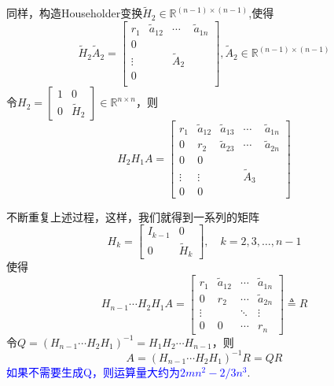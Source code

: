\documentclass[notheorems,serif]{beamer}
\begin{document}
\begin{frame}
同样，构造Householder变换$\tilde{H}_{2} \in \mathbb{R}^{(n-1) \times(n-1)}$,使得
$$
\tilde{H}_{2} \tilde{A}_{2}=\left[\begin{array}{c|ccc}
{r_{1}}&{\tilde{a}_{12}} &\cdots& {\tilde{a}_{1 n}} \\ \hline 
0& & & \\
\vdots&&{\tilde{A}_{2}}& \\
0& & &\\
\end{array}\right],\tilde{A}_{2} \in \mathbb{R}^{(n-1) \times(n-1)}
$$
令$H_{2}=\left[\begin{array}{cc}{1} & {0} \\ {0} & {\tilde{H}_{2}}\end{array}\right] \in \mathbb{R}^{n \times n}$，则
$$
H_{2} H_{1} A=
\left[\begin{array}{cc|ccc}
{r_{1}} & {\tilde{a}_{12}} & {\tilde{a}_{13}} & {\cdots} &{\tilde{a}_{1 n}} \\ 
{0} & {r_{2}} & {\tilde{a}_{23}}& {\cdots} & {\tilde{a}_{2 n}} \\ 
\hline 
0 & {0} &   &  &  \\
\vdots&\vdots& &{\tilde{A}_{3}}  & \\
{0} & {0} & {} & & \end{array}\right]
$$
\end{frame}

\begin{frame}
不断重复上述过程，这样，我们就得到一系列的矩阵
$$
H_{k}=\left[\begin{array}{cc}{I_{k-1}} & {0} \\ {0} & {\tilde{H}_{k}}\end{array}\right], \quad k=2,3, \ldots, n-1
$$
使得
$$
H_{n-1} \cdots H_{2} H_{1} A=\left[\begin{array}{cccc}{r_{1}} & {\tilde{a}_{12}} & {\cdots} & {\tilde{a}_{1 n}} \\ {0} & {r_{2}} & {\cdots} & {\tilde{a}_{2 n}} \\ {\vdots} & {} & {\ddots} & {\vdots} \\ {0} & {0} & {\cdots} & {r_{n}}\end{array}\right] \triangleq R
$$
令$Q=\left(H_{n-1} \cdots H_{2} H_{1}\right)^{-1}=H_{1} H_{2} \cdots H_{n-1}$，则
$$
A=\left(H_{n-1} \cdots H_{2} H_{1}\right)^{-1} R=Q R
$$
\textcolor{blue}{如果不需要生成Q，则运算量大约为$2mn^{2}-2/3n^{3}$}.\end{frame}
\end{document}
